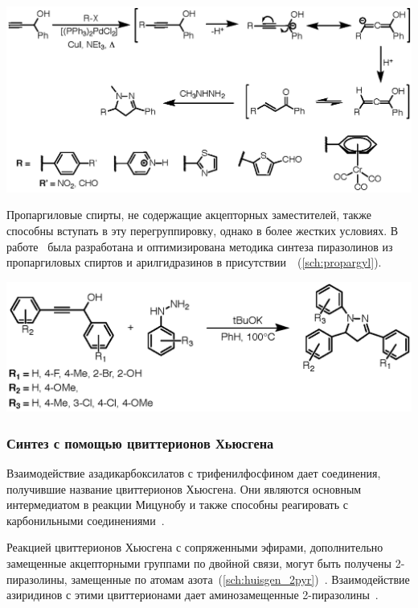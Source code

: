 \begin{scheme}
    \centering
    \includegraphics{sections/literature/img/sonogashira.eps}
    \caption{}
    \label{sch:sonogashira}
\end{scheme}

Пропаргиловые спирты, не содержащие акцепторных заместителей, также способны вступать в эту перегруппировку, однако в более жестких условиях.
В работе~\cite{Wang2014} была разработана и оптимизирована методика синтеза пиразолинов из пропаргиловых спиртов и арилгидразинов в присутствии~~(\ref{sch:propargyl}).

\begin{scheme}
    \centering
    \includegraphics{sections/literature/img/propargyl.eps}
    \caption{}
    \label{sch:propargyl}
\end{scheme}

\subsubsection{Синтез с помощью цвиттерионов Хьюсгена}
Взаимодействие азадикарбоксилатов с трифенилфосфином дает соединения, получившие название цвиттерионов Хьюсгена.
Они являются основным интермедиатом в реакции Мицунобу и также способны реагировать с карбонильными соединениями~\cite{Otte2005}.

Реакцией цвиттерионов Хьюсгена с сопряженными эфирами, дополнительно замещенные акцепторными группами по двойной связи, могут быть получены 2-пиразолины, замещенные по атомам азота~(\ref{sch:huisgen_2pyr})~\cite{Yamazaki2012}.
Взаимодействие азиридинов с этими цвиттерионами дает аминозамещенные 2-пиразолины~\cite{Cui2008}.

